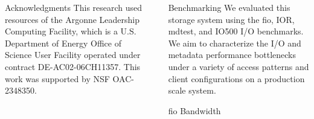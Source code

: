 \documentclass[final]{beamer}
\newlength{\sepwidth}
\newlength{\colwidth}
\newcommand{\separatorcolumn}{\begin{column}{\sepwidth}\end{column}}
\begin{document}
\begin{frame}[t, fragile]
\begin{columns}[t]
\begin{column}{\colwidth}
  \begin{block}{Acknowledgments}
  This research used resources of the Argonne Leadership Computing Facility, 
  which is a U.S. Department of Energy Office of Science User Facility 
  operated under contract DE-AC02-06CH11357. This work was supported by NSF OAC-2348350.
  \end{block}
 
\end{column}

\separatorcolumn

\begin{column}{\colwidth}


  \begin{block}{Benchmarking}
    We evaluated this storage system using the fio, IOR, mdtest, and IO500 I/O benchmarks. 
    We aim to characterize the I/O and metadata performance bottlenecks under a 
    variety of access patterns and client configurations on a production scale system.
    
  \end{block}

  \begin{block}{fio Bandwidth}

    
    

\end{block}
\end{column}
\end{columns}
\end{frame}
\end{document}

